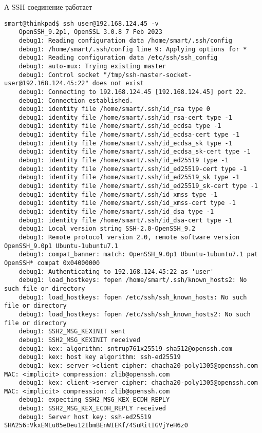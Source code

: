 А SSH соединение работает
\begin{Verbatim}[frame=single]
    smart@thinkpad$ ssh user@192.168.124.45 -v
    OpenSSH_9.2p1, OpenSSL 3.0.8 7 Feb 2023
    debug1: Reading configuration data /home/smart/.ssh/config
    debug1: /home/smart/.ssh/config line 9: Applying options for *
    debug1: Reading configuration data /etc/ssh/ssh_config
    debug1: auto-mux: Trying existing master
    debug1: Control socket "/tmp/ssh-master-socket-user@192.168.124.45:22" does not exist
    debug1: Connecting to 192.168.124.45 [192.168.124.45] port 22.
    debug1: Connection established.
    debug1: identity file /home/smart/.ssh/id_rsa type 0
    debug1: identity file /home/smart/.ssh/id_rsa-cert type -1
    debug1: identity file /home/smart/.ssh/id_ecdsa type -1
    debug1: identity file /home/smart/.ssh/id_ecdsa-cert type -1
    debug1: identity file /home/smart/.ssh/id_ecdsa_sk type -1
    debug1: identity file /home/smart/.ssh/id_ecdsa_sk-cert type -1
    debug1: identity file /home/smart/.ssh/id_ed25519 type -1
    debug1: identity file /home/smart/.ssh/id_ed25519-cert type -1
    debug1: identity file /home/smart/.ssh/id_ed25519_sk type -1
    debug1: identity file /home/smart/.ssh/id_ed25519_sk-cert type -1
    debug1: identity file /home/smart/.ssh/id_xmss type -1
    debug1: identity file /home/smart/.ssh/id_xmss-cert type -1
    debug1: identity file /home/smart/.ssh/id_dsa type -1
    debug1: identity file /home/smart/.ssh/id_dsa-cert type -1
    debug1: Local version string SSH-2.0-OpenSSH_9.2
    debug1: Remote protocol version 2.0, remote software version OpenSSH_9.0p1 Ubuntu-1ubuntu7.1
    debug1: compat_banner: match: OpenSSH_9.0p1 Ubuntu-1ubuntu7.1 pat OpenSSH* compat 0x04000000
    debug1: Authenticating to 192.168.124.45:22 as 'user'
    debug1: load_hostkeys: fopen /home/smart/.ssh/known_hosts2: No such file or directory
    debug1: load_hostkeys: fopen /etc/ssh/ssh_known_hosts: No such file or directory
    debug1: load_hostkeys: fopen /etc/ssh/ssh_known_hosts2: No such file or directory
    debug1: SSH2_MSG_KEXINIT sent
    debug1: SSH2_MSG_KEXINIT received
    debug1: kex: algorithm: sntrup761x25519-sha512@openssh.com
    debug1: kex: host key algorithm: ssh-ed25519
    debug1: kex: server->client cipher: chacha20-poly1305@openssh.com MAC: <implicit> compression: zlib@openssh.com
    debug1: kex: client->server cipher: chacha20-poly1305@openssh.com MAC: <implicit> compression: zlib@openssh.com
    debug1: expecting SSH2_MSG_KEX_ECDH_REPLY
    debug1: SSH2_MSG_KEX_ECDH_REPLY received
    debug1: Server host key: ssh-ed25519 SHA256:VkxEMLu05eDeu12IbmBEnWIEKf/4SuRitIGVjYeH6z0

\end{Verbatim}
